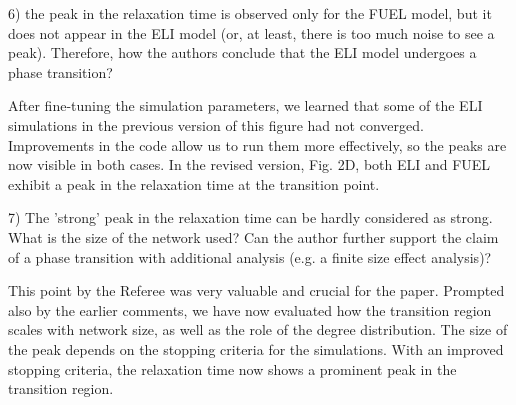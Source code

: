 \documentclass[11pt]{article}
\newcommand{\outNim}[1]{}
\begin{document}
\begin{response}
 
\end{response}
\begin{response}{
6) the peak in the relaxation time is observed only for the FUEL model, but it does not appear in the ELI model (or, at least, there is too much noise to see a peak). 
Therefore, how the authors conclude that the ELI model undergoes a phase transition? 
}

After fine-tuning the simulation parameters, we learned that some of the ELI simulations in the previous version of this figure had not converged. 
Improvements in the code allow us to run them more effectively, so the peaks are now visible in both cases. 
In the revised version, Fig. 2D, both ELI and FUEL exhibit a peak in the relaxation time at the  transition point.


\end{response}
\begin{response}{
7) The 'strong' peak in the relaxation time can be hardly considered as strong. What is the size of the network used? Can the author further support the claim of a phase transition with additional analysis (e.g. a finite size effect analysis)?

}
This point by the Referee was very valuable and crucial for the paper.
Prompted also by the earlier comments, we have now evaluated how the transition region scales with network size, as well as the role of the degree distribution. 
The size of the peak depends on the stopping criteria for the simulations. 
With an improved stopping criteria, the relaxation time now shows a prominent peak in the transition region.
\outNim{ 
Also, the peak in glass transition is not as sharp as the peak in a genuine second-order transition. 
}%




\end{response}
\end{document}
